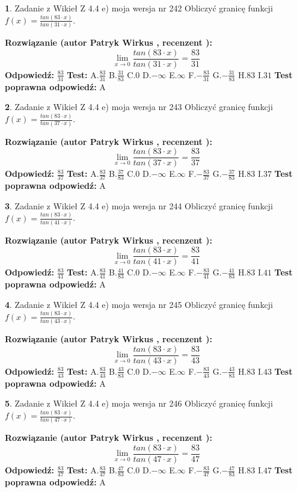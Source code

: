 \documentclass[12pt, a4paper]{article}
\theoremstyle{definition} %
\newtheorem{zad}{}
\newcommand{\zadStart}[1]{\begin{zad}#1\newline}
\newcommand{\zadStop}{\end{zad}}
\newcommand{\rozwStart}[2]{\noindent \textbf{Rozwiązanie (autor #1 , recenzent #2): }\newline}
\newcommand{\rozwStop}{\newline}
\newcommand{\odpStart}{\noindent \textbf{Odpowiedź:}\newline}
\newcommand{\odpStop}{\newline}
\newcommand{\testStart}{\noindent \textbf{Test:}\newline}
\newcommand{\testStop}{\newline}
\newcommand{\kluczStart}{\noindent \textbf{Test poprawna odpowiedź:}\newline}
\newcommand{\kluczStop}{\newline}
\begin{document}
\zadStart{Zadanie z Wikieł Z 4.4 e) moja wersja nr 242}
Obliczyć granicę funkcji $f(x)=\frac{tan(83\cdot x)}{tan(31\cdot x)}$.
\zadStop
\rozwStart{Patryk Wirkus}{}
$$\lim\limits_{x\to 0}\frac{tan(83\cdot x)}{tan(31\cdot x)}=
\frac{83}{31}$$
\rozwStop
\odpStart
$\frac{83}{31}$
\odpStop
\testStart
A.$\frac{83}{31}$
B.$\frac{31}{83}$
C.$0$
D.$-\infty$
E.$\infty$
F.$-\frac{83}{31}$
G.$-\frac{31}{83}$
H.$83$
I.$31$
\testStop
\kluczStart
A
\kluczStop



\zadStart{Zadanie z Wikieł Z 4.4 e) moja wersja nr 243}
Obliczyć granicę funkcji $f(x)=\frac{tan(83\cdot x)}{tan(37\cdot x)}$.
\zadStop
\rozwStart{Patryk Wirkus}{}
$$\lim\limits_{x\to 0}\frac{tan(83\cdot x)}{tan(37\cdot x)}=
\frac{83}{37}$$
\rozwStop
\odpStart
$\frac{83}{37}$
\odpStop
\testStart
A.$\frac{83}{37}$
B.$\frac{37}{83}$
C.$0$
D.$-\infty$
E.$\infty$
F.$-\frac{83}{37}$
G.$-\frac{37}{83}$
H.$83$
I.$37$
\testStop
\kluczStart
A
\kluczStop



\zadStart{Zadanie z Wikieł Z 4.4 e) moja wersja nr 244}
Obliczyć granicę funkcji $f(x)=\frac{tan(83\cdot x)}{tan(41\cdot x)}$.
\zadStop
\rozwStart{Patryk Wirkus}{}
$$\lim\limits_{x\to 0}\frac{tan(83\cdot x)}{tan(41\cdot x)}=
\frac{83}{41}$$
\rozwStop
\odpStart
$\frac{83}{41}$
\odpStop
\testStart
A.$\frac{83}{41}$
B.$\frac{41}{83}$
C.$0$
D.$-\infty$
E.$\infty$
F.$-\frac{83}{41}$
G.$-\frac{41}{83}$
H.$83$
I.$41$
\testStop
\kluczStart
A
\kluczStop



\zadStart{Zadanie z Wikieł Z 4.4 e) moja wersja nr 245}
Obliczyć granicę funkcji $f(x)=\frac{tan(83\cdot x)}{tan(43\cdot x)}$.
\zadStop
\rozwStart{Patryk Wirkus}{}
$$\lim\limits_{x\to 0}\frac{tan(83\cdot x)}{tan(43\cdot x)}=
\frac{83}{43}$$
\rozwStop
\odpStart
$\frac{83}{43}$
\odpStop
\testStart
A.$\frac{83}{43}$
B.$\frac{43}{83}$
C.$0$
D.$-\infty$
E.$\infty$
F.$-\frac{83}{43}$
G.$-\frac{43}{83}$
H.$83$
I.$43$
\testStop
\kluczStart
A
\kluczStop



\zadStart{Zadanie z Wikieł Z 4.4 e) moja wersja nr 246}
Obliczyć granicę funkcji $f(x)=\frac{tan(83\cdot x)}{tan(47\cdot x)}$.
\zadStop
\rozwStart{Patryk Wirkus}{}
$$\lim\limits_{x\to 0}\frac{tan(83\cdot x)}{tan(47\cdot x)}=
\frac{83}{47}$$
\rozwStop
\odpStart
$\frac{83}{47}$
\odpStop
\testStart
A.$\frac{83}{47}$
B.$\frac{47}{83}$
C.$0$
D.$-\infty$
E.$\infty$
F.$-\frac{83}{47}$
G.$-\frac{47}{83}$
H.$83$
I.$47$
\testStop
\kluczStart
A
\kluczStop
\end{document}
